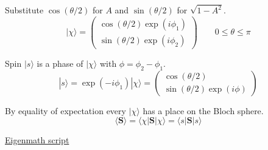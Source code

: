 Substitute $\cos(\theta/2)$ for $A$ and $\sin(\theta/2)$ for $\sqrt{1-A^2}$.
\begin{equation*}
|\chi\rangle=\begin{pmatrix}
\cos(\theta/2)\exp(i\phi_1)
\\
\sin(\theta/2)\exp(i\phi_2)
\end{pmatrix}
\qquad
0\le\theta\le\pi
\end{equation*}

Spin $|s\rangle$ is a phase of $|\chi\rangle$ with $\phi=\phi_2-\phi_1$.
\begin{equation*}
|s\rangle=\exp(-i\phi_1)|\chi\rangle
=\begin{pmatrix}
\cos(\theta/2)
\\
\sin(\theta/2)\exp(i\phi)
\end{pmatrix}
\end{equation*}

By equality of expectation every $|\chi\rangle$ has a place on the Bloch sphere.
\begin{equation*}
\langle\mathbf S\rangle=\langle\chi|\mathbf S|\chi\rangle=\langle s|\mathbf S|s\rangle
\end{equation*}

\fi

\href{https://georgeweigt.github.io/examples/bloch-sphere-1-demo.html}{Eigenmath script}


